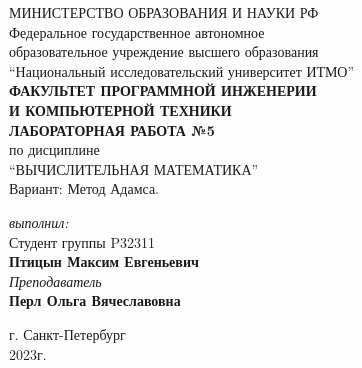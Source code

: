 \begin{center}
	МИНИСТЕРСТВО ОБРАЗОВАНИЯ И НАУКИ РФ\\
	\hfill \break
	Федеральное государственное автономное\\
	образовательное учреждение высшего образования\\
	``Национальный исследовательский университет ИТМО''\\
	\hfill \break
	\textbf{ФАКУЛЬТЕТ ПРОГРАММНОЙ ИНЖЕНЕРИИ \\
	И КОМПЬЮТЕРНОЙ ТЕХНИКИ}\\
	\vspace{2cm}
	\large{\textbf{ЛАБОРАТОРНАЯ РАБОТА №5}}\\
	\hfill \break
	по дисциплине\\
		\large{``ВЫЧИСЛИТЕЛЬНАЯ МАТЕМАТИКА''}\\
	\hfill \break
	Вариант: Метод Адамса. \\
	\vspace{5cm}
	\begin{flushright}
	\textit{выполнил:}\\
	Студент группы P32311\\
	\textbf{Птицын Максим Евгеньевич}\\
	\textit{Преподаватель}\\
	\textbf{Перл Ольга Вячеславовна}
	\end{flushright}
\end{center}

\vfill

\begin{center}
	г. Санкт-Петербург\\2023г.
\end{center}
\thispagestyle{empty}
\newpage